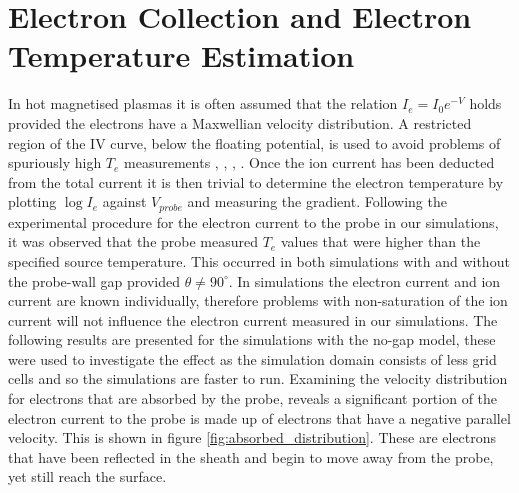 \section{Electron Collection and Electron Temperature Estimation}
In hot magnetised plasmas it is often assumed that the relation $I_e = I_0 e^{-V}$ holds provided the electrons have a Maxwellian velocity distribution. A restricted region of the IV curve, below the floating potential, is used to avoid problems of spuriously high $T_e$ measurements \cite{below_floating}, \cite{electrical_probes}, \cite{iv_safe_region}, \cite{pin-plate-pitts}. Once the ion current has been deducted from the total current it is then trivial to determine the electron temperature by plotting $\log{I_e}$ against $V_{probe}$ and measuring the gradient. 
Following the experimental procedure for the electron current to the probe in our simulations, it was observed that the probe measured $T_e$ values that were higher than the specified source temperature. This occurred in both simulations with and without the probe-wall gap provided $\theta \neq 90^{\circ}$. In simulations the electron current and ion current are known individually, therefore problems with non-saturation of the ion current will not influence the electron current measured in our simulations. The following results are presented for the simulations with the no-gap model, these were used to investigate the effect as the simulation domain consists of less grid cells and so the simulations are faster to run.
Examining the velocity distribution for electrons that are absorbed by the probe, reveals a significant portion of the electron current to the probe is made up of electrons that have a negative parallel velocity. This is shown in figure \ref{fig:absorbed_distribution}. These are electrons that have been reflected in the sheath and begin to move away from the probe, yet still reach the surface. 

